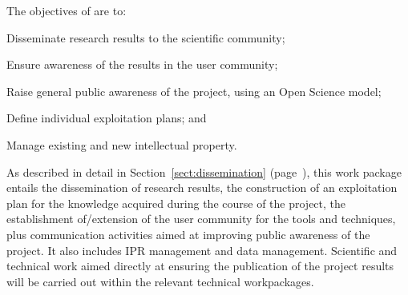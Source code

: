 \addtocounter{wpno}{1}
\begin{Workpackage}{\thewpno}
\WPTitle{\wpname{\thewpno}}


\begin{WPObjectives}
The objectives of \theWP{} are to:
\begin{compactitem}
  \item Disseminate research results to the scientific community;
  \item Ensure awareness of the results in the user community;
  \item Raise general public awareness of the \TheProject{} project, using an Open Science model;
  \item Define individual exploitation plans;
  and
  \item Manage existing and new intellectual property.
\end{compactitem}
\end{WPObjectives}

\begin{WPDescription}
As described in detail in Section~\ref{sect:dissemination} (page~\pageref{sect:dissemination}), this work package entails the dissemination of research results, the construction of an exploitation plan for the knowledge acquired during the course of the \TheProject{} project, 
the establishment of/extension of the user community for the \TheProject{} tools and techniques,
plus communication activities aimed at improving public awareness of the \TheProject{} project.
It also includes IPR management and data management.
Scientific and technical work aimed directly at ensuring the publication of the project results will be carried out within the relevant technical workpackages.
\end{WPDescription}

\begin{Task}




\TaskHeader{}



\end{Task}
\end{Workpackage}
